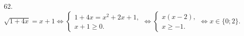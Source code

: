 62. $\sqrt{1+4x}=x+1\Leftrightarrow\begin{cases}1+4x=x^2+2x+1,\\ x+1\geqslant0.\end{cases}
\Leftrightarrow\begin{cases}x(x-2),\\ x\geqslant-1.\end{cases}\Leftrightarrow x\in\{0; 2\}.$\\

